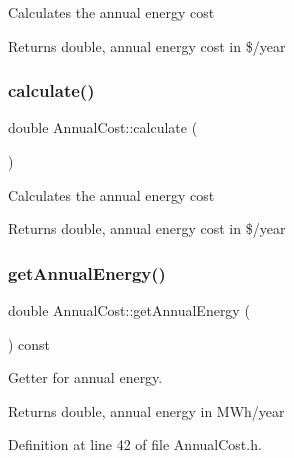 Calculates the annual energy cost \begin{DoxyReturn}{Returns}
double, annual energy cost in \$/year 
\end{DoxyReturn}
\mbox{\label{class_annual_cost_adb12b66af50d01746c3f6f0d430b1fdd}} 
\subsubsection{\texorpdfstring{calculate()}{calculate()}\hspace{0.1cm}{\footnotesize\ttfamily [3/3]}}
{\footnotesize\ttfamily double Annual\+Cost\+::calculate (\begin{DoxyParamCaption}{ }\end{DoxyParamCaption})}

Calculates the annual energy cost \begin{DoxyReturn}{Returns}
double, annual energy cost in \$/year 
\end{DoxyReturn}
\mbox{\label{class_annual_cost_a0e217b7df05e6a03503e14d96570a192}} 
\subsubsection{\texorpdfstring{get\+Annual\+Energy()}{getAnnualEnergy()}\hspace{0.1cm}{\footnotesize\ttfamily [1/3]}}
{\footnotesize\ttfamily double Annual\+Cost\+::get\+Annual\+Energy (\begin{DoxyParamCaption}{ }\end{DoxyParamCaption}) const\hspace{0.3cm}{\ttfamily [inline]}}

Getter for annual energy. \begin{DoxyReturn}{Returns}
double, annual energy in M\+Wh/year 
\end{DoxyReturn}


Definition at line 42 of file Annual\+Cost.\+h.

\mbox{\label{class_annual_cost_a0e217b7df05e6a03503e14d96570a192}} 

